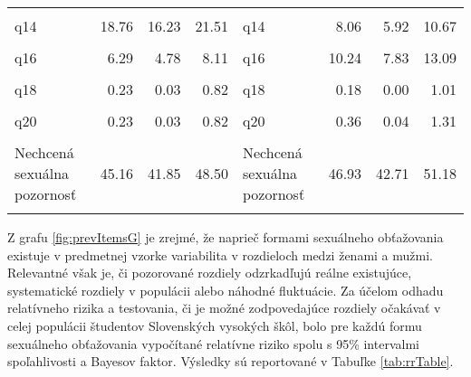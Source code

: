 \documentclass[
]{article}
\begin{document}
\begin{table}[H]
{\begin{tabular}[t]{lrrrlrrr}
\cellcolor{gray!6}{q13} & \cellcolor{gray!6}{6.47} & \cellcolor{gray!6}{4.92} & \cellcolor{gray!6}{8.32} & \cellcolor{gray!6}{q13} & \cellcolor{gray!6}{6.20} & \cellcolor{gray!6}{4.33} & \cellcolor{gray!6}{8.56}\\
q14 & 18.76 & 16.23 & 21.51 & q14 & 8.06 & 5.92 & 10.67\\
\cellcolor{gray!6}{q15} & \cellcolor{gray!6}{14.93} & \cellcolor{gray!6}{12.62} & \cellcolor{gray!6}{17.47} & \cellcolor{gray!6}{q15} & \cellcolor{gray!6}{10.07} & \cellcolor{gray!6}{7.66} & \cellcolor{gray!6}{12.94}\\
\addlinespace
q16 & 6.29 & 4.78 & 8.11 & q16 & 10.24 & 7.83 & 13.09\\
\cellcolor{gray!6}{q17} & \cellcolor{gray!6}{1.83} & \cellcolor{gray!6}{1.05} & \cellcolor{gray!6}{2.95} & \cellcolor{gray!6}{q17} & \cellcolor{gray!6}{3.46} & \cellcolor{gray!6}{2.10} & \cellcolor{gray!6}{5.35}\\
q18 & 0.23 & 0.03 & 0.82 & q18 & 0.18 & 0.00 & 1.01\\
\cellcolor{gray!6}{q19} & \cellcolor{gray!6}{0.23} & \cellcolor{gray!6}{0.03} & \cellcolor{gray!6}{0.82} & \cellcolor{gray!6}{q19} & \cellcolor{gray!6}{0.18} & \cellcolor{gray!6}{0.00} & \cellcolor{gray!6}{1.02}\\
q20 & 0.23 & 0.03 & 0.82 & q20 & 0.36 & 0.04 & 1.31\\
\addlinespace
\cellcolor{gray!6}{Rodovo motivované obťažovanie} & \cellcolor{gray!6}{75.68} & \cellcolor{gray!6}{72.72} & \cellcolor{gray!6}{78.46} & \cellcolor{gray!6}{Rodovo motivované obťažovanie} & \cellcolor{gray!6}{76.90} & \cellcolor{gray!6}{73.16} & \cellcolor{gray!6}{80.34}\\
Nechcená sexuálna pozornosť & 45.16 & 41.85 & 48.50 & Nechcená sexuálna pozornosť & 46.93 & 42.71 & 51.18\\
\cellcolor{gray!6}{Sexuálny nátlak} & \cellcolor{gray!6}{2.03} & \cellcolor{gray!6}{1.21} & \cellcolor{gray!6}{3.18} & \cellcolor{gray!6}{Sexuálny nátlak} & \cellcolor{gray!6}{3.79} & \cellcolor{gray!6}{2.36} & \cellcolor{gray!6}{5.74}\\
\bottomrule
\end{tabular}}
\end{table}

Z grafu \ref{fig:prevItemsG} je zrejmé, že naprieč formami sexuálneho obťažovania existuje v predmetnej vzorke variabilita v rozdieloch medzi ženami a mužmi. Relevantné však je, či pozorované rozdiely odzrkadľujú reálne existujúce, systematické rozdiely v populácii alebo náhodné fluktuácie. Za účelom odhadu relatívneho rizika a testovania, či je možné zodpovedajúce rozdiely očakávať v celej populácii študentov Slovenských vysokých škôl, bolo pre každú formu sexuálneho obťažovania vypočítané relatívne riziko spolu s 95\% intervalmi spoľahlivosti a Bayesov faktor. Výsledky sú reportované v Tabuľke \ref{tab:rrTable}.
\end{document}
